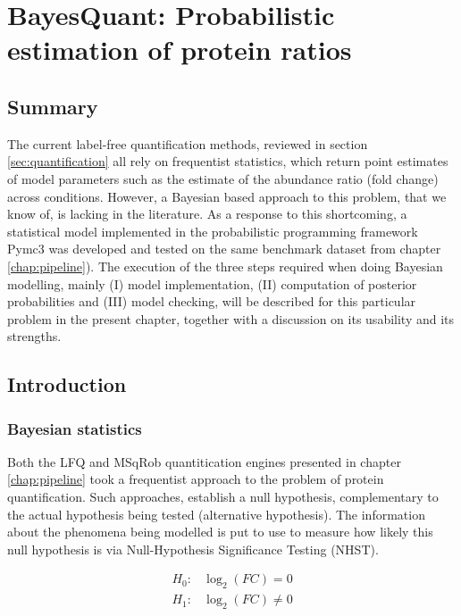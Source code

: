 \documentclass[11pt, a4paper]{report}
\begin{document}
\chapter{BayesQuant: Probabilistic estimation of protein ratios}
\label{chap:model}

\section*{Summary}

The current label-free quantification methods, reviewed in section \ref{sec:quantification} all rely on frequentist statistics, which return point estimates of model parameters such as the estimate of the abundance ratio (fold change) across conditions. However, a Bayesian based approach to this problem, that we know of, is lacking in the literature. As a response to this shortcoming, a statistical model implemented in the probabilistic programming framework Pymc3 was developed and tested on the same benchmark dataset from chapter \ref{chap:pipeline}). The execution of the three steps required when doing Bayesian modelling, mainly (I) model implementation, (II) computation of posterior probabilities and (III) model checking, will be described for this particular problem in the present chapter, together with a discussion on its usability and its strengths.

\section{Introduction}

\subsection{Bayesian statistics}

Both the LFQ and MSqRob quantitication engines presented in chapter \ref{chap:pipeline} took a frequentist approach to the problem of protein quantification. Such approaches, establish a null hypothesis, complementary to the actual hypothesis being tested (alternative hypothesis). The information about the phenomena being modelled is put to use to measure how likely this null hypothesis is via Null-Hypothesis Significance Testing (\ac{NHST}).


\begin{align}
H_0: & \log_2(FC) = 0 \nonumber \\
H_1: & \log_2(FC) \neq 0 \nonumber
\end{align}
\end{document}
